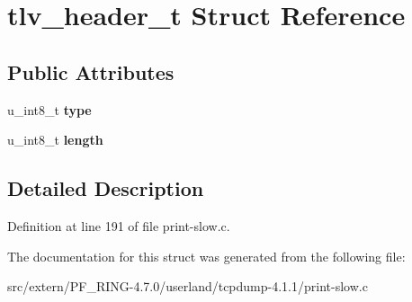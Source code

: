 \hypertarget{structtlv__header__t}{
\section{tlv\_\-header\_\-t Struct Reference}
\label{structtlv__header__t}
}
\subsection*{Public Attributes}
\begin{DoxyCompactItemize}
\item 
\hypertarget{structtlv__header__t_a4c4c268ecd20f4af973ab0232ebe4ac8}{
u\_\-int8\_\-t {\bfseries type}}
\label{structtlv__header__t_a4c4c268ecd20f4af973ab0232ebe4ac8}

\item 
\hypertarget{structtlv__header__t_a932fe25d7df587cedaca1e8185ddc015}{
u\_\-int8\_\-t {\bfseries length}}
\label{structtlv__header__t_a932fe25d7df587cedaca1e8185ddc015}

\end{DoxyCompactItemize}


\subsection{Detailed Description}


Definition at line 191 of file print-\/slow.c.



The documentation for this struct was generated from the following file:\begin{DoxyCompactItemize}
\item 
src/extern/PF\_\-RING-\/4.7.0/userland/tcpdump-\/4.1.1/print-\/slow.c\end{DoxyCompactItemize}
